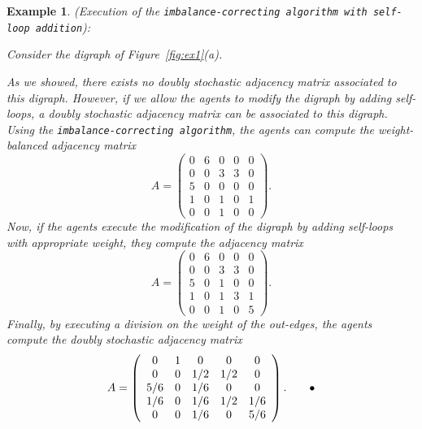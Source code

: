 \documentclass[final]{siamltex}
\newtheorem{example}[theorem]{Example}
\begin{document}
\begin{example}{\mbox{}\textup{({Execution of the
    {\texttt{imbalance-correcting algorithm with
    self-loop addition}\xspace}}):}}\label{ex:self_loop_addition} 
  {\rm Consider the digraph of Figure~\ref{fig:ex1}(a).
    
    
    
    
    
    
    
    
    
    As we showed, there exists no doubly stochastic adjacency matrix
    associated to this digraph. However, if we allow the agents to
    modify the digraph by adding self-loops, a doubly stochastic
    adjacency matrix can be associated to this digraph. Using the
    {\texttt{imbalance-correcting algorithm}\xspace}, the agents can compute the weight-balanced adjacency matrix
    \[
    A=\left(\begin{array}{ccccc}
        0 & 6 & 0 &0 & 0\\
        0 & 0 & 3 & 3 & 0\\
        5 & 0 & 0 & 0 & 0\\
        1 & 0 & 1 & 0 & 1\\
        0 & 0 & 1 & 0 &0
      \end{array}\right).
    \]
    Now, if the agents execute the modification of the digraph by
    adding self-loops with appropriate weight, they compute the
    adjacency matrix
    \[
    A=\left(\begin{array}{ccccc}
        0 & 6 & 0 &0 & 0\\
        0 & 0 & 3 & 3 & 0\\
        5 & 0 & 1 & 0 & 0\\
        1 & 0 & 1 & 3 & 1\\
        0 & 0 & 1 & 0 & 5
      \end{array}\right).
    \]
    Finally, by executing a
    division on the weight of the out-edges, the agents compute the
    doubly stochastic adjacency matrix
    \[
    A=\left(\begin{array}{ccccc}
        0 & 1 & 0 &0 & 0\\
        0 & 0 & 1/2 & 1/2 & 0\\
        5/6 & 0 & 1/6 & 0 & 0\\
        1/6 & 0 & 1/6 & 1/2 & 1/6\\
        0 & 0 & 1/6 & 0 & 5/6
      \end{array}\right).
    {\tag*{$\bullet$}}
    \]  
  }
\end{example}
\end{document}
